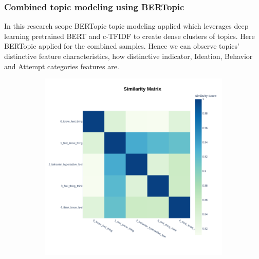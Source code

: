 \documentclass[sn-mathphys,Numbered]{sn-jnl}%
\theoremstyle{thmstyleone}%
\theoremstyle{thmstyletwo}%
\theoremstyle{thmstylethree}%
\begin{document}
\subsubsection{Combined topic modeling using BERTopic}
In this research scope BERTopic topic modeling applied which leverages deep learning pretrained BERT and c-TFIDF to create dense clusters of topics. Here BERTopic applied for the combined samples. Hence we can observe topics' distinctive feature characteristics, how distinctive indicator, Ideation, Behavior and Attempt categories features are.

\begin{figure}[h!]
\centering
\begin{subfigure}{0.45\textwidth}
    \includegraphics[width=\textwidth]{bertopic/combined_bertopic_topics_heatmap_frequency.png}
    \label{redditdist}
\end{subfigure}
\hfill
\begin{subfigure}{0.45\textwidth}

\end{subfigure}
\end{figure}
\end{document}
